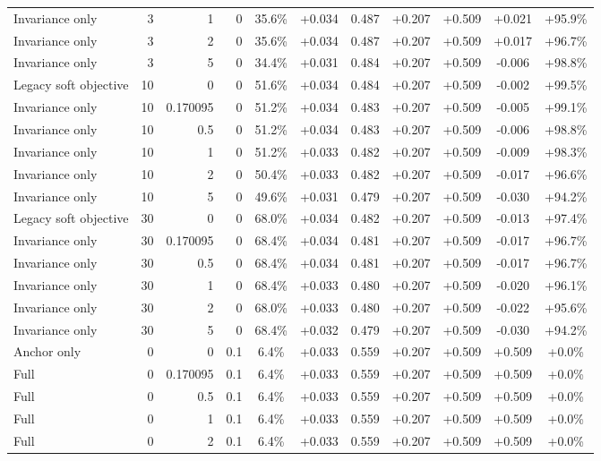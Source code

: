 \begin{table}[htbp]
\begin{tabular}{lrrrccccccc}
Invariance only & 3 & 1 & 0 & 35.6\% & +0.034 & 0.487 & +0.207 & +0.509 & +0.021 & +95.9\% \\
Invariance only & 3 & 2 & 0 & 35.6\% & +0.034 & 0.487 & +0.207 & +0.509 & +0.017 & +96.7\% \\
Invariance only & 3 & 5 & 0 & 34.4\% & +0.031 & 0.484 & +0.207 & +0.509 & -0.006 & +98.8\% \\
Legacy soft objective & 10 & 0 & 0 & 51.6\% & +0.034 & 0.484 & +0.207 & +0.509 & -0.002 & +99.5\% \\
Invariance only & 10 & 0.170095 & 0 & 51.2\% & +0.034 & 0.483 & +0.207 & +0.509 & -0.005 & +99.1\% \\
Invariance only & 10 & 0.5 & 0 & 51.2\% & +0.034 & 0.483 & +0.207 & +0.509 & -0.006 & +98.8\% \\
Invariance only & 10 & 1 & 0 & 51.2\% & +0.033 & 0.482 & +0.207 & +0.509 & -0.009 & +98.3\% \\
Invariance only & 10 & 2 & 0 & 50.4\% & +0.033 & 0.482 & +0.207 & +0.509 & -0.017 & +96.6\% \\
Invariance only & 10 & 5 & 0 & 49.6\% & +0.031 & 0.479 & +0.207 & +0.509 & -0.030 & +94.2\% \\
Legacy soft objective & 30 & 0 & 0 & 68.0\% & +0.034 & 0.482 & +0.207 & +0.509 & -0.013 & +97.4\% \\
Invariance only & 30 & 0.170095 & 0 & 68.4\% & +0.034 & 0.481 & +0.207 & +0.509 & -0.017 & +96.7\% \\
Invariance only & 30 & 0.5 & 0 & 68.4\% & +0.034 & 0.481 & +0.207 & +0.509 & -0.017 & +96.7\% \\
Invariance only & 30 & 1 & 0 & 68.4\% & +0.033 & 0.480 & +0.207 & +0.509 & -0.020 & +96.1\% \\
Invariance only & 30 & 2 & 0 & 68.0\% & +0.033 & 0.480 & +0.207 & +0.509 & -0.022 & +95.6\% \\
Invariance only & 30 & 5 & 0 & 68.4\% & +0.032 & 0.479 & +0.207 & +0.509 & -0.030 & +94.2\% \\
Anchor only & 0 & 0 & 0.1 & 6.4\% & +0.033 & 0.559 & +0.207 & +0.509 & +0.509 & +0.0\% \\
Full & 0 & 0.170095 & 0.1 & 6.4\% & +0.033 & 0.559 & +0.207 & +0.509 & +0.509 & +0.0\% \\
Full & 0 & 0.5 & 0.1 & 6.4\% & +0.033 & 0.559 & +0.207 & +0.509 & +0.509 & +0.0\% \\
Full & 0 & 1 & 0.1 & 6.4\% & +0.033 & 0.559 & +0.207 & +0.509 & +0.509 & +0.0\% \\
Full & 0 & 2 & 0.1 & 6.4\% & +0.033 & 0.559 & +0.207 & +0.509 & +0.509 & +0.0\% \\

\end{tabular}
\end{table}

